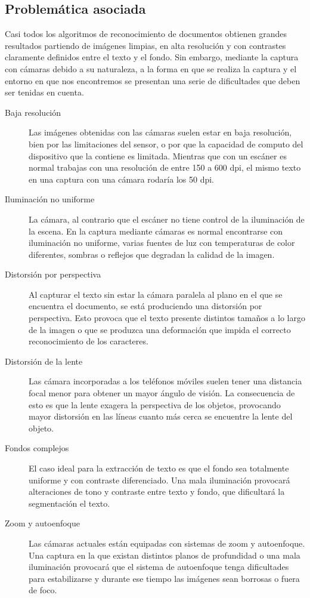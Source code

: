   \subsection{Problemática asociada}
  Casi todos los algoritmos de reconocimiento de documentos obtienen grandes resultados partiendo de imágenes limpias, en alta resolución y con contrastes claramente definidos entre el texto y el fondo. Sin embargo, mediante la captura con cámaras debido a su naturaleza, a la forma en que se realiza la captura y el entorno en que nos encontremos se presentan una serie de dificultades que deben ser tenidas en cuenta.  
  \begin{description}
  \item[Baja resolución] Las imágenes obtenidas con las cámaras suelen estar en baja resolución, bien por las limitaciones del sensor, o por que la capacidad de computo del dispositivo que la contiene es limitada. Mientras que con un escáner es normal trabajas con una resolución de entre 150 a 600 dpi, el mismo texto en una captura con una cámara rodaría los 50 dpi.
  \item[Iluminación no uniforme] La cámara, al contrario que el escáner no tiene control de la iluminación de la escena. En la captura mediante cámaras es normal encontrarse con iluminación no uniforme, varias fuentes de luz con temperaturas de color diferentes, sombras o reflejos que degradan la calidad de la imagen.
  \item[Distorsión por perspectiva] Al capturar el texto sin estar la cámara paralela al plano en el que se encuentra el documento, se está produciendo una distorsión por perspectiva. Esto provoca que el texto presente distintos tamaños a lo largo de la imagen o que se produzca una deformación que impida el correcto reconocimiento de los caracteres. 
  \item[Distorsión de la lente] Las cámara incorporadas a los teléfonos móviles suelen tener una distancia focal menor para obtener un mayor ángulo de visión. La consecuencia de esto es que la lente exagera la perspectiva de los objetos, provocando mayor distorsión en las líneas cuanto más cerca se encuentre la lente del objeto.
  \item[Fondos complejos] El caso ideal para la extracción de texto es que el fondo sea totalmente uniforme y con contraste diferenciado. Una mala iluminación provocará alteraciones de tono y contraste entre texto y fondo, que dificultará la segmentación el texto. 
  \item[Zoom y autoenfoque] Las cámaras actuales están equipadas con sistemas de zoom y autoenfoque. Una captura en la que existan distintos planos de profundidad o una mala iluminación provocará que el sistema de autoenfoque tenga dificultades para estabilizarse y durante ese tiempo las imágenes sean borrosas o fuera de foco.

\end{description}
